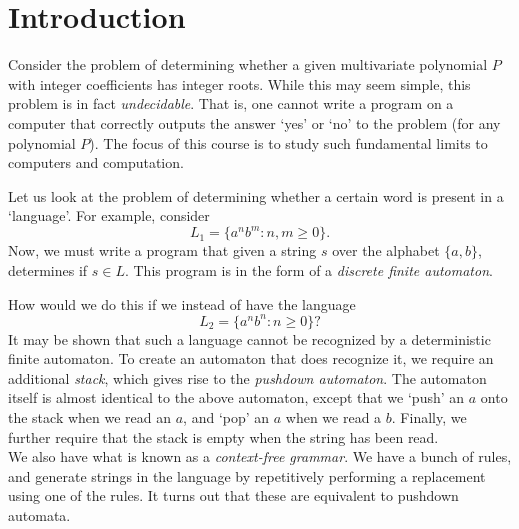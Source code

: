 \section{Introduction}

Consider the problem of determining whether a given multivariate polynomial $P$ with integer coefficients has integer roots. While this may seem simple, this problem is in fact \emph{undecidable}. That is, one cannot write a program on a computer that correctly outputs the answer `yes' or `no' to the problem (for any polynomial $P$). The focus of this course is to study such fundamental limits to computers and computation.

Let us look at the problem of determining whether a certain word is present in a `language'. For example, consider
\[ L_1 = \{ a^n b^m : n,m\ge 0 \}. \]
Now, we must write a program that given a string $s$ over the alphabet $\{a,b\}$, determines if $s \in L$. This program is in the form of a \emph{discrete finite automaton}.

\begin{center}
\end{center}

How would we do this if we instead of have the language
\[ L_2 = \{ a^n b^n : n \ge 0 \}? \]
It may be shown that such a language cannot be recognized by a deterministic finite automaton. To create an automaton that does recognize it, we require an additional \emph{stack}, which gives rise to the \emph{pushdown automaton}. The automaton itself is almost identical to the above automaton, except that we `push' an $a$ onto the stack when we read an $a$, and `pop' an $a$ when we read a $b$. Finally, we further require that the stack is empty when the string has been read.\\

We also have what is known as a \emph{context-free grammar}. We have a bunch of rules, and generate strings in the language by repetitively performing a replacement using one of the rules. It turns out that these are equivalent to pushdown automata.\\

